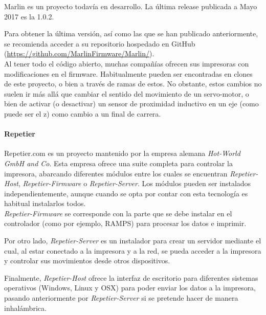 \documentclass[a4paper,12pt]{article}
\begin{document}
Marlin es un proyecto todavía en desarrollo. La última release publicada a Mayo 2017 es la 1.0.2.

Para obtener la última versión, así como las que se han publicado anteriormente, se recomienda acceder a su repositorio hospedado en GitHub (\href{https://github.com/MarlinFirmware/Marlin/}{https://github.com/MarlinFirmware/Marlin/}).\\

Al tener todo el código abierto, muchas compañías ofrecen sus impresoras con modificaciones en el firmware. Habitualmente pueden ser encontradas en clones de este proyecto, o bien a través de ramas de estos. No obstante, estos cambios no suelen ir más allá que cambiar el sentido del movimiento de un servo-motor, o bien de activar (o desactivar) un sensor de proximidad inductivo en un eje (como puede ser el z) como cambio a un final de carrera.\\


\paragraph{Repetier}
Repetier.com es un proyecto mantenido por la empresa alemana \emph{Hot-World GmbH and Co}. Esta empresa ofrece una suite completa para controlar la impresora, abarcando diferentes módulos entre los cuales se encuentran \emph{Repetier-Host}, \emph{Repetier-Firmware} o \emph{Repetier-Server}. Los módulos pueden ser instalados independientemente, aunque cuando se opta por contar con esta tecnología es habitual instalarlos todos.\\

\emph{Repetier-Firmware} se corresponde con la parte que se debe instalar en el controlador (como por ejemplo, RAMPS) para procesar los datos e imprimir. 

Por otro lado, \emph{Repetier-Server} es un instalador para crear un servidor mediante el cual, al estar conectado a la impresora y a la red, se pueda acceder a la impresora y controlar sus movimientos desde otros dispositivos.

Finalmente, \emph{Repetier-Host} ofrece la interfaz de escritorio para diferentes sistemas operativos (Windows, Linux y OSX) para poder enviar los datos a la impresora, pasando anteriormente por \emph{Repetier-Server} si se pretende hacer de manera inhalámbrica.


\end{document}
